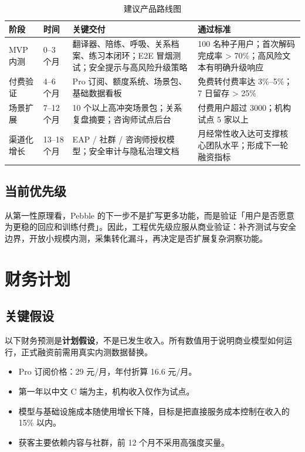 \documentclass[UTF8,11pt,a4paper]{ctexart}
\newcommand{\assumption}[1]{\textcolor{PebbleClay}{\textbf{#1}}}
\newcommand{\thbg}[1]{\textcolor{PebbleInk}{\textbf{#1}}}
\begin{document}
\begin{table}[htbp]
\small
\caption{建议产品路线图}
\centering
\begin{tabularx}{\textwidth}{p{2.4cm}p{2.4cm}YY}
\toprule
{}\thbg{阶段} & \thbg{时间} & \thbg{关键交付} & \thbg{通过标准} \\
\midrule
MVP 内测 & 0--3 个月 & 翻译器、陪练、呼吸、关系档案、练习本闭环；E2E 冒烟测试；安全提示与高风险升级策略 & 100 名种子用户；首次解码完成率 \textgreater{} 70\%；高风险文本有明确升级响应 \\
付费验证 & 4--6 个月 & Pro 订阅、额度系统、场景包、基础数据看板 & 免费转付费率达 3\%--5\%；7 日留存 \textgreater{} 25\% \\
场景扩展 & 7--12 个月 & 10 个以上高冲突场景包；关系复盘摘要；咨询师试点后台 & 付费用户超过 3000；机构试点 5 家以上 \\
渠道化增长 & 13--18 个月 & EAP / 社群 / 咨询师授权模型；安全审计与隐私治理文档 & 月经常性收入达可支撑核心团队水平；形成下一轮融资指标 \\
\bottomrule
\end{tabularx}
\end{table}

\subsection{当前优先级}

从第一性原理看，Pebble 的下一步不是扩写更多功能，而是验证「用户是否愿意为更稳的回应和训练付费」。因此，工程优先级应服从商业验证：补齐测试与安全边界，开放小规模内测，采集转化漏斗，再决定是否扩展复杂洞察功能。

\section{财务计划}

\subsection{关键假设}

以下财务预测是\assumption{计划假设}，不是已发生收入。所有数值用于说明商业模型如何运行，正式融资前需用真实内测数据替换。

\begin{itemize}
  \item Pro 订阅价格：29 元/月，年付折算 16.6 元/月。
  \item 第一年以中文 C 端为主，机构收入仅作为试点。
  \item 模型与基础设施成本随使用增长下降，目标是把直接服务成本控制在收入的 15\% 以内。
  \item 获客主要依赖内容与社群，前 12 个月不采用高强度买量。
\end{itemize}
\end{document}
